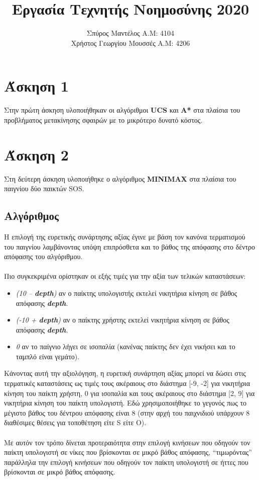 \documentclass{article}
\title{Εργασία Τεχνητής Νοημοσύνης 2020}
\author{Σπύρος Μαντέλος Α.Μ: 4104\\Χρήστος Γεωργίου Μουσσές Α.Μ: 4206}
\date{}
\begin{document}
\maketitle
\section*{Άσκηση 1}
Στην πρώτη άσκηση υλοποιήθηκαν οι αλγόριθμοι \textbf{UCS} και \textbf{A*} στα πλαίσια του προβλήματος μετακίνησης σφαιρών με το μικρότερο δυνατό κόστος.
\newpage
\section*{Άσκηση 2}
Στη δεύτερη άσκηση υλοποιήθηκε ο αλγόριθμος \textbf{MINIMAX} στα πλαίσια του παιγνίου δύο παικτών SOS.
\subsection*{Αλγόριθμος}
Η επιλογή της ευρετικής συνάρτησης αξίας έγινε με βάση τον κανόνα τερματισμού του παιγνίου λαμβάνοντας υπόψη επιπρόσθετα και το βάθος της απόφασης στο δέντρο απόφασης του αλγόριθμου.\\\\
Πιο συγκεκριμένα ορίστηκαν οι εξής τιμές για την αξία των τελικών καταστάσεων:
\begin{itemize}
    \item \textit{(10 – \textbf{depth})} αν ο παίκτης υπολογιστής εκτελεί νικητήρια κίνηση σε βάθος απόφασης \textit{\textbf{depth}}.
    \item \textit{(-10 + \textbf{depth})} αν ο παίκτης χρήστης εκτελεί νικητήρια κίνηση σε βάθος απόφασης \textit{\textbf{depth}}.
    \item \textit{0} αν το παίγνιο λήγει σε ισοπαλία (κανένας παίκτης δεν έχει νικήσει και το ταμπλό είναι γεμάτο).
\end{itemize}
Κάνοντας αυτή την αξιολόγηση, η ευρετική συνάρτηση αξίας μπορεί να δώσει στις τερματικές καταστάσεις ως τιμές τους ακέραιους στο διάστημα
[-9, -2] για νικητήρια κίνηση του παίκτη χρήστη, 0 για ισοπαλία και τους ακέραιους στο διάστημα [2, 9] για
νικητήρια κίνηση του παίκτη υπολογιστή. Εδώ χρησιμοποιήθηκε το γεγονός πως το μέγιστο βάθος του δέντρου
απόφασης είναι 8 (στην αρχή του παιχνιδιού υπάρχουν 8 διαθέσιμες θέσεις
για τοποθέτηση είτε S είτε O).\\\\
Με αυτόν τον τρόπο δίνεται προτεραιότητα στην επιλογή κινήσεων που οδηγούν τον παίκτη υπολογιστή σε νίκες που βρίσκονται σε μικρό βάθος απόφασης, “τιμωρόντας” παράλληλα την επιλογή
κινήσεων που οδηγούν τον παίκτη υπολογιστή σε ήττες που βρίσκονται σε μικρό βάθος απόφασης.
\end{document}

